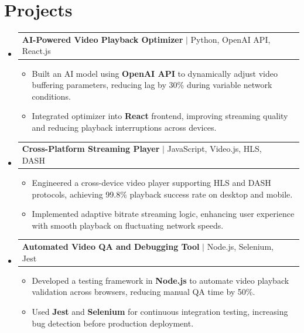 \documentclass[letterpaper,11pt]{article}
\makeatletter
\newcommand{\resumeItem}[1]{
  \item\footnotesize{
    {#1 \vspace{-2pt}}
  }
}
\newcommand{\resumeProjectHeading}[2]{
    \item
    \begin{tabular*}{1.001\textwidth}{l@{\extracolsep{\fill}}r}
      \small#1 & \textbf{\small #2}\\
    \end{tabular*}\vspace{-7pt}
}
\newcommand{\resumeSubHeadingListStart}{\begin{itemize}[leftmargin=0pt, label={}]}
\newcommand{\resumeSubHeadingListEnd}{\end{itemize}}
\newcommand{\resumeItemListStart}{\begin{itemize}[leftmargin=*]}
\newcommand{\resumeItemListEnd}{\end{itemize}\vspace{-5pt}}
\makeatother
\begin{document}
\section{Projects}
    \vspace{-5pt}
    \resumeSubHeadingListStart
      \resumeProjectHeading
          {\textbf{AI-Powered Video Playback Optimizer} $|$ Python, OpenAI API, React.js}{}
          \resumeItemListStart
              \resumeItem{Built an AI model using \textbf{OpenAI API} to dynamically adjust video buffering parameters, reducing lag by 30\% during variable network conditions.}
              \resumeItem{Integrated optimizer into \textbf{React} frontend, improving streaming quality and reducing playback interruptions across devices.}
          \resumeItemListEnd
          \vspace{-12pt}
      \resumeProjectHeading
          {\textbf{Cross-Platform Streaming Player} $|$ JavaScript, Video.js, HLS, DASH}{}
          \resumeItemListStart
              \resumeItem{Engineered a cross-device video player supporting HLS and DASH protocols, achieving 99.8\% playback success rate on desktop and mobile.}
              \resumeItem{Implemented adaptive bitrate streaming logic, enhancing user experience with smooth playback on fluctuating network speeds.}
          \resumeItemListEnd
          \vspace{-12pt}
      \resumeProjectHeading
          {\textbf{Automated Video QA and Debugging Tool} $|$ Node.js, Selenium, Jest}{}
          \resumeItemListStart
              \resumeItem{Developed a testing framework in \textbf{Node.js} to automate video playback validation across browsers, reducing manual QA time by 50\%.}
              \resumeItem{Used \textbf{Jest} and \textbf{Selenium} for continuous integration testing, increasing bug detection before production deployment.}
          \resumeItemListEnd 
    \resumeSubHeadingListEnd
\end{document}
